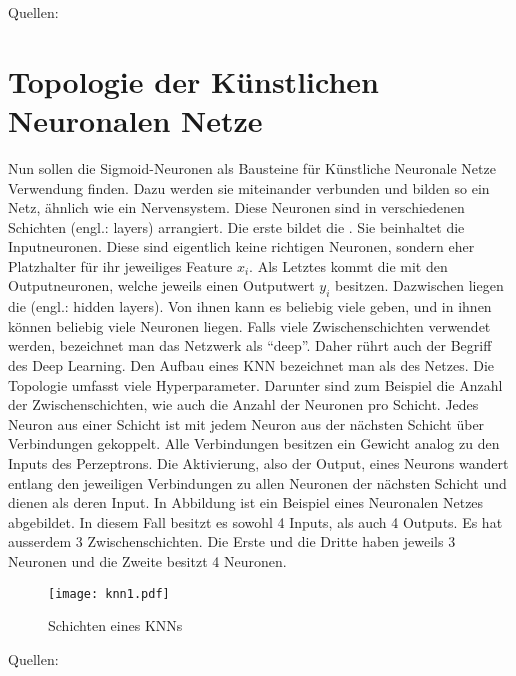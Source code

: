 \para{}
Quellen: \cite{wiki:kuenstliches_neuron} \cite{wiki:sigmoidfunktion} \cite{book:hands-on}


\section{Topologie der Künstlichen Neuronalen Netze}
Nun sollen die Sigmoid-Neuronen als Bausteine für Künstliche
Neuronale Netze Verwendung finden. Dazu werden sie miteinander verbunden und bilden so ein Netz,
ähnlich wie ein Nervensystem.
\para{}
Diese Neuronen sind in verschiedenen Schichten (engl.: layers)
arrangiert. Die erste bildet die . Sie beinhaltet die
Inputneuronen. Diese sind eigentlich keine richtigen
Neuronen, sondern eher Platzhalter für ihr jeweiliges Feature $x_i$. Als Letztes kommt die
 mit den Outputneuronen, welche jeweils einen Outputwert $y_i$
besitzen. Dazwischen liegen die  (engl.: hidden layers). Von ihnen kann es
beliebig viele geben, und in ihnen können beliebig viele Neuronen liegen.
Falls viele Zwischenschichten verwendet werden, bezeichnet man das Netzwerk als
``deep''. Daher rührt auch der Begriff des Deep Learning.
Den Aufbau eines KNN bezeichnet man als  des Netzes. Die
Topologie umfasst viele Hyperparameter. Darunter sind zum Beispiel die Anzahl
der Zwischenschichten, wie auch
die Anzahl der Neuronen pro Schicht.
\para{}
Jedes Neuron aus einer Schicht ist mit jedem Neuron aus der nächsten Schicht über
Verbindungen gekoppelt. Alle Verbindungen besitzen ein Gewicht analog zu den Inputs des
Perzeptrons. Die Aktivierung, also der Output, eines Neurons wandert entlang den jeweiligen
Verbindungen zu allen Neuronen der nächsten Schicht und dienen als deren Input.
\para{}
In Abbildung  ist ein Beispiel eines Neuronalen Netzes
abgebildet. In diesem Fall besitzt es sowohl 4 Inputs, als auch 4 Outputs. Es hat
ausserdem 3 Zwischenschichten. Die Erste und die Dritte haben jeweils 3 Neuronen
und die Zweite besitzt 4 Neuronen. \\

\begin{figure}[h!]
  \centering
  \texttt{[image: knn1.pdf]}
  \caption{Schichten eines KNNs}
  \label{fig:nn_layers}
\end{figure}

\para{}
Quellen: \cite{wiki:kuenstliches_neuronales_netz} \cite{Nielsen} \cite{book:hands-on}

